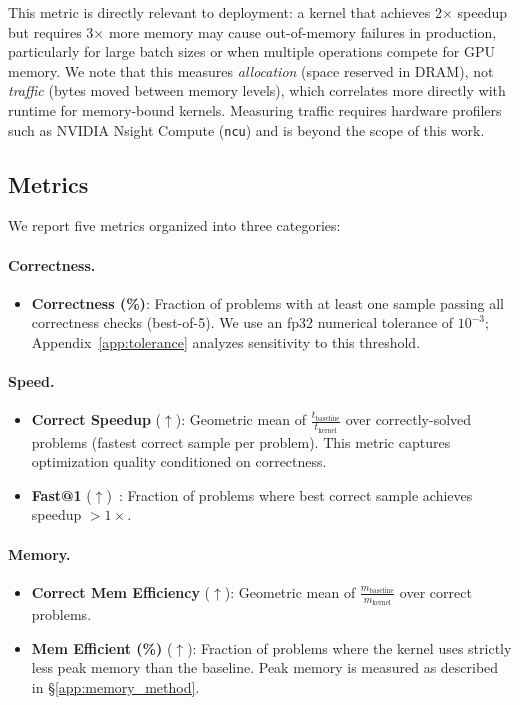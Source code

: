\documentclass[]{fairmeta}
\begin{document}
This metric is directly relevant to deployment: a kernel that achieves 2$\times$ speedup but requires 3$\times$ more memory may cause out-of-memory failures in production, particularly for large batch sizes or when multiple operations compete for GPU memory. We note that this measures \emph{allocation} (space reserved in DRAM), not \emph{traffic} (bytes moved between memory levels), which correlates more directly with runtime for memory-bound kernels. Measuring traffic requires hardware profilers such as NVIDIA Nsight Compute (\texttt{ncu}) and is beyond the scope of this work.


\subsection{Metrics}
\label{sec:metrics}

We report five metrics organized into three categories:

\paragraph{Correctness.}
\begin{itemize}[nosep]
\item \textbf{Correctness (\%)}: Fraction of problems with at least one sample passing all correctness checks (best-of-5). We use an fp32 numerical tolerance of $10^{-3}$; Appendix~\ref{app:tolerance} analyzes sensitivity to this threshold.
\end{itemize}

\paragraph{Speed.}
\begin{itemize}[nosep]
\item \textbf{Correct Speedup} ($\uparrow$): Geometric mean of $\frac{t_{\text{baseline}}}{t_{\text{kernel}}}$ over correctly-solved problems (fastest correct sample per problem). This metric captures optimization quality conditioned on correctness.
\item \textbf{Fast@1} ($\uparrow$)~\citep{kernelbench}: Fraction of problems where best correct sample achieves speedup $>1\times$.
\end{itemize}

\paragraph{Memory.}
\begin{itemize}[nosep]
\item \textbf{Correct Mem Efficiency} ($\uparrow$): Geometric mean of $\frac{m_{\text{baseline}}}{m_{\text{kernel}}}$ over correct problems.
\item \textbf{Mem Efficient (\%)} ($\uparrow$): Fraction of problems where the kernel uses strictly less peak memory than the baseline. Peak memory is measured as described in \S\ref{app:memory_method}.
\end{itemize}
\end{document}
